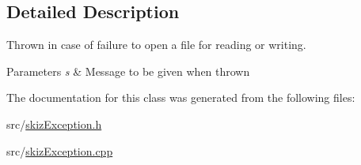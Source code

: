 \subsection{Detailed Description}
Thrown in case of failure to open a file for reading or writing. 


\begin{DoxyParams}{Parameters}
{\em s} & Message to be given when thrown \\
\hline
\end{DoxyParams}


The documentation for this class was generated from the following files\+:\begin{DoxyCompactItemize}
\item 
src/\mbox{\hyperlink{skizException_8h}{skiz\+Exception.\+h}}\item 
src/\mbox{\hyperlink{skizException_8cpp}{skiz\+Exception.\+cpp}}\end{DoxyCompactItemize}
